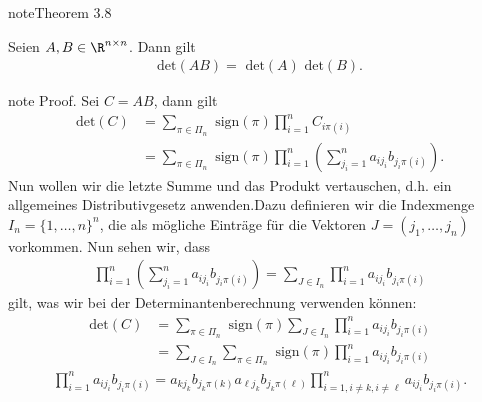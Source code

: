 \documentclass[letterpaper,10pt,english]{jupyterBook}
\begin{document}
\label{vektorraeume/LGS:theorem-17}
\begin{sphinxadmonition}{note}{Theorem 3.8}



Seien \(A,B \in \R^{n \times n}\). Dann gilt
\begin{equation*}
\begin{split} \text{det}(AB) = \text{ det}(A) \text{ det}(B).\end{split}
\end{equation*}\end{sphinxadmonition}

\begin{sphinxadmonition}{note}
Proof.  Sei \(C=AB\), dann gilt
\begin{align*}
\text{det}(C) &= \sum_{\pi \in \Pi_n} \text{ sign}(\pi) \prod_{i=1}^n C_{i\pi(i)} \\
&= \sum_{\pi \in \Pi_n} \text{ sign}(\pi) \prod_{i=1}^n ( \sum_{j_i=1}^n a_{ij_i} b_{j_i\pi(i)})  .
\end{align*}
Nun wollen wir die letzte Summe und das Produkt vertauschen, d.h. ein allgemeines Distributivgesetz anwenden.Dazu definieren wir die Indexmenge \( I_n = \{1,\ldots,n\}^n\), die als mögliche Einträge für die Vektoren \(J=(j_1,\ldots,j_n)\) vorkommen. Nun sehen wir, dass
\begin{equation*}
\begin{split} \prod_{i=1}^n ( \sum_{j_i=1}^n a_{ij_i} b_{j_i\pi(i)}) = \sum_{J \in I_n} \prod_{i=1}^n  a_{ij_i} b_{j_i\pi(i)}\end{split}
\end{equation*}
gilt, was wir bei der Determinantenberechnung verwenden können:
\begin{align*} \text{det}(C) &= \sum_{\pi \in \Pi_n} \text{ sign}(\pi) \sum_{J \in I_n} \prod_{i=1}^n  a_{ij_i} b_{j_i\pi(i)}  \\ &= \sum_{J \in I_n}  \sum_{\pi \in \Pi_n} \text{ sign}(\pi)\prod_{i=1}^n  a_{ij_i} b_{j_i\pi(i)}\end{align*}\begin{equation*}
\begin{split} \prod_{i=1}^n  a_{ij_i} b_{j_i\pi(i)} = a_{kj_k} b_{j_k\pi(k)} a_{\ell j_k} b_{j_k\pi(\ell)} \prod_{i=1, i \neq k, i \neq \ell}^n  a_{ij_i} b_{j_i\pi(i)}. \end{split}

\end{equation*}
\end{sphinxadmonition}
\end{document}
